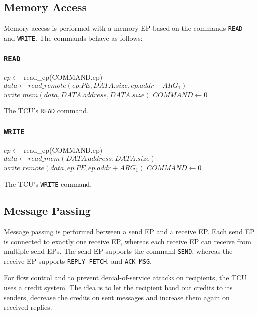 \documentclass[a4paper,11pt]{article}
\begin{document}
\subsection{Memory Access}

Memory access is performed with a memory EP based on the commands \texttt{READ} and \texttt{WRITE}. The commands behave as follows:

\subsubsection{\texttt{READ}}

\begin{algorithm}[H]
    $ep \gets$ read\_ep(COMMAND.ep)\;
    \BlankLine
    $data \gets read\_remote(ep.PE, DATA.size, ep.addr + ARG_1)$\;
    $write\_mem(data, DATA.address, DATA.size)$\;
    \BlankLine
    $COMMAND \gets 0$\;
    \caption{The TCU's \texttt{READ} command.}
\end{algorithm}

\subsubsection{\texttt{WRITE}}

\begin{algorithm}[H]
    $ep \gets$ read\_ep(COMMAND.ep)\;
    \BlankLine
    $data \gets read\_mem(DATA.address, DATA.size)$\;
    $write\_remote(data, ep.PE, ep.addr + ARG_1)$\;
    \BlankLine
    $COMMAND \gets 0$\;
    \caption{The TCU's \texttt{WRITE} command.}
\end{algorithm}

\subsection{Message Passing}

Message passing is performed between a send EP and a receive EP. Each send EP is connected to
exactly one receive EP, whereas each receive EP can receive from multiple send EPs. The send EP
supports the command \texttt{SEND}, whereas the receive EP supports \texttt{REPLY}, \texttt{FETCH},
and \texttt{ACK\_MSG}.

For flow control and to prevent denial-of-service attacks on recipients, the TCU uses a credit
system. The idea is to let the recipient hand out credits to its senders, decrease the credits on
sent messages and increase them again on received replies.
\end{document}
